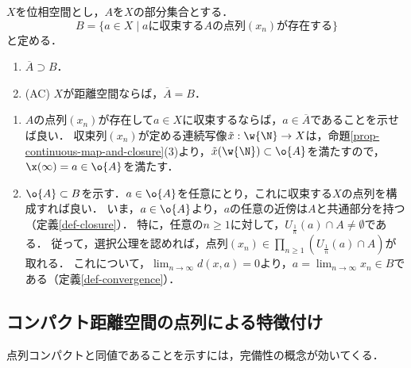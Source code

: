 \documentclass[uplatex,dvipdfmx]{jsreport}
\begin{document}
\begin{corollary}[点列による閉包の特徴付け]\label{cor-characterization-of-closure-in-terms-of-limits}
    $X$を位相空間とし，$A$を$X$の部分集合とする．
    \[ B=\{a\in X\mid aに収束するAの点列(x_n)が存在する\} \]
    と定める．
    \begin{enumerate}
        \item $\overline{A}\supset B$．
        \item (AC) $X$が距離空間ならば，$\overline{A}=B$．
    \end{enumerate}
\end{corollary}
\begin{Proof}\mbox{}
    \begin{enumerate}
        \item $A$の点列$(x_n)$が存在して$a\in X$に収束するならば，$a\in\overline{A}$であることを示せば良い．
        収束列$(x_n)$が定める連続写像$\tilde{x}:\w{\N}\to X$は，命題\ref{prop-continuous-map-and-closure}(3)より，$\tilde{x}(\w{\N})\subset\o{A}$を満たすので，$\x(\infty)=a\in\o{A}$を満たす．
        \item 
        $\o{A}\subset B$を示す．$a\in\o{A}$を任意にとり，これに収束する$X$の点列を構成すれば良い．
        いま，$a\in\o{A}$より，$a$の任意の近傍は$A$と共通部分を持つ（定義\ref{def-closure}）．
        特に，任意の$n\ge 1$に対して，$U_{\frac{1}{n}}(a)\cap A\ne\emptyset$である．
        従って，選択公理を認めれば，点列$(x_n)\in\prod_{n\ge 1}(U_{\frac{1}{n}}(a)\cap A)$が取れる．
        これについて，$\lim_{n\to\infty}d(x,a)=0$より，$a=\lim_{n\to\infty}x_n\in B$である（定義\ref{def-convergence}）．
    \end{enumerate}
\end{Proof}

\subsection{コンパクト距離空間の点列による特徴付け}

\begin{tcolorbox}[colframe=ForestGreen, colback=ForestGreen!10!white,breakable,colbacktitle=ForestGreen!40!white,coltitle=black,fonttitle=\bfseries\sffamily,
title=]
    点列コンパクトと同値であることを示すには，完備性の概念が効いてくる．
\end{tcolorbox}
\end{document}
